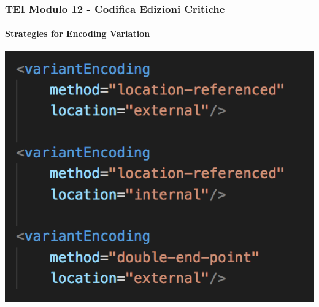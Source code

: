 






\begin{frame}
    \frametitle{TEI Modulo 12 - Codifica Edizioni Critiche}
    \framesubtitle{Strategies for Encoding Variation}
    \addtocounter{nframe}{1}
    

    \begin{center}
       \includegraphics[width=.95\textwidth]{imgs/variantEncoding.png}
    \end{center}

\end{frame}







